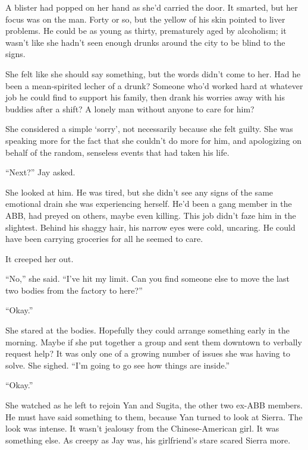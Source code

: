 A blister had popped on her hand as she'd carried the door.  It smarted, but her focus was on the man.  Forty or so, but the yellow of his skin pointed to liver problems.  He could be as young as thirty, prematurely aged by alcoholism; it wasn't like she hadn't seen enough drunks around the city to be blind to the signs.



She felt like she should say something, but the words didn't come to her.  Had he been a mean-spirited lecher of a drunk?  Someone who'd worked hard at whatever job he could find to support his family, then drank his worries away with his buddies after a shift?  A lonely man without anyone to care for him?



She considered a simple `sorry', not necessarily because she felt guilty.  She was speaking more for the fact that she couldn't do more for him, and apologizing on behalf of the random, senseless events that had taken his life.



``Next?'' Jay asked.



She looked at him.  He was tired, but she didn't see any signs of the same emotional drain she was experiencing herself.  He'd been a gang member in the ABB, had preyed on others, maybe even killing.  This job didn't faze him in the slightest.  Behind his shaggy hair, his narrow eyes were cold, uncaring.  He could have been carrying groceries for all he seemed to care.



It creeped her out.



``No,'' she said.  ``I've hit my limit.  Can you find someone else to move the last two bodies from the factory to here?''



``Okay.''



She stared at the bodies.  Hopefully they could arrange something early in the morning.  Maybe if she put together a group and sent them downtown to verbally request help?  It was only one of a growing number of issues she was having to solve.  She sighed.  ``I'm going to go see how things are inside.''



``Okay.''



She watched as he left to rejoin Yan and Sugita, the other two ex-ABB members.  He must have said something to them, because Yan turned to look at Sierra.  The look was intense.  It wasn't jealousy from the Chinese-American girl.  It was something else.  As creepy as Jay was, his girlfriend's stare scared Sierra more.



